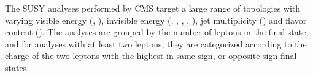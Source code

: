 The SUSY analyses performed by CMS target a large range of topologies with varying
visible energy
(\HT, \MJ), 
invisible energy (\MET, \MT, \MTtwo, \dphiwl, \LT),
jet multiplicity (\njets)
and flavor content (\nbtags).
The analyses are grouped by the number of leptons in the final state,
and for analyses with at least two leptons,
they are categorized according to the charge of the two leptons with the highest \pt
in same-sign, or opposite-sign final states.
